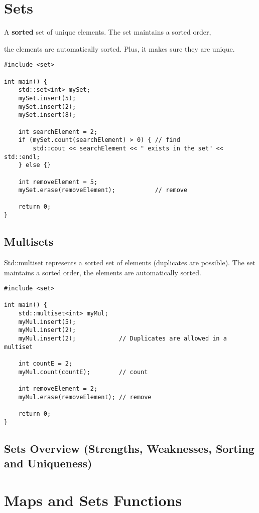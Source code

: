 \documentclass[openany]{report}
\begin{document}
\section{Sets}

A \textbf{sorted} set of unique elements. The set maintains a sorted order,

the elements are automatically sorted. Plus, it makes sure they are unique.

\begin{verbatim}
#include <set>

int main() {
    std::set<int> mySet;
    mySet.insert(5);
    mySet.insert(2);
    mySet.insert(8);

    int searchElement = 2;
    if (mySet.count(searchElement) > 0) { // find
        std::cout << searchElement << " exists in the set" << std::endl;
    } else {}

    int removeElement = 5;
    mySet.erase(removeElement);           // remove

    return 0;
}
\end{verbatim}

\subsection{Multisets}

Std::multiset represents a sorted set of elements (duplicates are possible). The set maintains a sorted order,
the elements are automatically sorted.

\begin{verbatim}
#include <set>

int main() {
    std::multiset<int> myMul;
    myMul.insert(5);
    myMul.insert(2);
    myMul.insert(2);            // Duplicates are allowed in a multiset

    int countE = 2;
    myMul.count(countE);        // count

    int removeElement = 2;
    myMul.erase(removeElement); // remove

    return 0;
}
\end{verbatim}

\subsection{Sets Overview (Strengths, Weaknesses, Sorting and Uniqueness)}

\section{Maps and Sets Functions}
\end{document}

